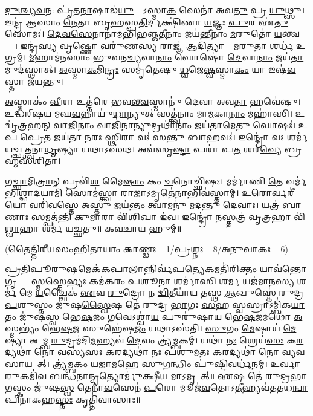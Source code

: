 \ul{𑌦𑍁}\ul{𑌶𑍍𑌚𑍍𑌯}\ul{𑌵}𑌨: 𑌪𑍃॑𑌤\ul{𑌨𑌾}𑌷𑌾𑌡॑\ul{𑌯𑍁}𑌧𑍍𑌯𑍋᳚𑌽𑌸𑍍𑌮𑌾\ul{𑌕}\ul{} 𑌸𑍇𑌨𑌾॑ 𑌅𑌵\ul{𑌤𑍁} 𑌪𑍍𑌰 \ul{𑌯𑍁}𑌥𑍍𑌸𑍁। 𑌇𑌨𑍍𑌦𑍍𑌰॑ 𑌆𑌸𑌾𑌂 \ul{𑌨𑍇}𑌤𑌾 𑌬𑍃\ul{𑌹}𑌸𑍍𑌪\ul{𑌤𑌿}𑌰𑍍𑌦𑌕𑍍𑌷𑌿॑𑌣𑌾 \ul{𑌯}𑌜𑍍𑌞𑌃 \ul{𑌪𑍁}𑌰 𑌏॑\ul{𑌤𑍁} 𑌸𑍋𑌮𑌃॑। \ul{𑌦𑍇}\ul{𑌵}\ul{𑌸𑍇}𑌨𑌾𑌨𑌾॑𑌮𑌭𑌿𑌭𑌞𑍍𑌜\ul{𑌤𑍀}𑌨𑌾𑌂 𑌜𑌯॑𑌨𑍍𑌤𑍀𑌨𑌾𑌂 \ul{𑌮}𑌰𑍁𑌤𑍋॑ \ul{𑌯}𑌨𑍍𑌤𑍍𑌵𑌗𑍍𑌰𑍇᳚। 𑌇𑌨𑍍𑌦𑍍𑌰॑\ul{𑌸𑍍𑌯} 𑌵𑍃\ul{𑌷𑍍𑌣𑍋} 𑌵𑌰𑍁॑𑌣\ul{𑌸𑍍𑌯} 𑌰𑌾𑌜𑍍𑌞॑ 𑌆\ul{𑌦𑌿}𑌤𑍍𑌯𑌾𑌨𑌾𑌂᳚ \ul{𑌮}𑌰𑍁\ul{𑌤𑌾}\ul{} 𑌶𑌰𑍍𑌧॑ \ul{𑌉}𑌗𑍍𑌰𑌮𑍍। \ul{𑌮}𑌹𑌾𑌮॑𑌨𑌸𑌾𑌂 𑌭𑍁𑌵𑌨\ul{𑌚𑍍𑌯}𑌵𑌾\ul{𑌨𑌾𑌂} 𑌘𑍋𑌷𑍋॑ \ul{𑌦𑍇}𑌵𑌾\ul{𑌨𑌾𑌂} 𑌜𑌯॑\ul{𑌤𑌾}𑌮𑍁𑌦॑𑌸𑍍𑌥𑌾𑌤𑍍। \ul{𑌅}𑌸𑍍𑌮𑌾\ul{𑌕}𑌮𑌿\ul{𑌨𑍍𑌦𑍍𑌰𑌃} 𑌸𑌮𑍃॑𑌤𑍇𑌷𑍁 \ul{𑌧𑍍𑌵}𑌜𑍇\ul{𑌷𑍍𑌵}𑌸𑍍𑌮𑌾\ul{𑌕𑌂} 𑌯𑌾 𑌇𑌷॑\ul{𑌵}𑌸𑍍𑌤𑌾 𑌜॑𑌯𑌨𑍍𑌤𑍁।

\ul{𑌅}𑌸𑍍𑌮𑌾𑌕𑌂॑ \ul{𑌵𑍀}𑌰𑌾 𑌉𑌤𑍍𑌤॑𑌰𑍇 𑌭𑌵\ul{𑌨𑍍𑌤𑍍𑌵}𑌸𑍍𑌮𑌾𑌨𑍁॑ 𑌦𑍇𑌵𑌾 𑌅𑌵\ul{𑌤𑌾} 𑌹𑌵𑍇॑𑌷𑍁। 𑌉𑌦𑍍𑌧॑𑌰𑍍‌𑌷𑌯 𑌮𑌘\ul{𑌵}𑌨𑍍𑌨𑌾𑌯𑍁॑\ul{𑌧𑌾}𑌨𑍍𑌯𑍁𑌤𑍍 𑌸𑌤𑍍𑌤𑍍𑌵॑𑌨𑌾𑌂 𑌮𑌾\ul{𑌮}𑌕𑌾\ul{𑌨𑌾𑌂} 𑌮𑌹𑌾॑𑌸𑌿। 𑌉𑌦𑍍𑌵𑍃॑𑌤𑍍𑌰𑌹𑌨𑍍 \ul{𑌵𑌾}𑌜𑌿\ul{𑌨𑌾𑌂} 𑌵𑌾𑌜𑌿॑\ul{𑌨𑌾}𑌨𑍍𑌯𑍁𑌦𑍍𑌰𑌥𑌾॑\ul{𑌨𑌾𑌂} 𑌜𑌯॑𑌤𑌾𑌮𑍇\ul{𑌤𑍁} 𑌘𑍋𑌷𑌃॑। 𑌉\ul{𑌪} 𑌪𑍍𑌰𑍇\ul{𑌤} 𑌜𑌯॑𑌤𑌾 𑌨𑌰𑌃 \ul{𑌸𑍍𑌥𑌿}𑌰𑌾 𑌵𑌃॑ 𑌸𑌨𑍍𑌤𑍁 \ul{𑌬𑌾}𑌹𑌵𑌃॑। 𑌇𑌨𑍍𑌦𑍍𑌰𑍋॑ \ul{𑌵𑌃} 𑌶𑌰𑍍𑌮॑ 𑌯𑌚𑍍𑌛𑌤𑍍𑌤𑍍𑌵𑌨𑌾\ul{𑌧𑍃}𑌷𑍍𑌯𑌾 𑌯𑌥𑌾𑌽𑌸॑𑌥। 𑌅𑌵॑𑌸𑍃\ul{𑌷𑍍𑌟𑌾} 𑌪𑌰𑌾॑ 𑌪\ul{𑌤} 𑌶𑌰॑\ul{𑌵𑍍𑌯𑍇} 𑌬𑍍𑌰𑌹𑍍𑌮॑𑌸𑌶𑌿𑌤𑌾।

𑌗\ul{𑌚𑍍𑌛𑌾}𑌮𑌿\ul{𑌤𑍍𑌰𑌾}𑌨𑍍 𑌪𑍍𑌰𑌵𑌿॑\ul{𑌶} 𑌮𑍈\ul{𑌷𑌾𑌂} 𑌕𑌂 \ul{𑌚}𑌨𑍋𑌚𑍍𑌛𑌿॑𑌷𑌃। 𑌮𑌰𑍍𑌮𑌾॑𑌣𑌿 \ul{𑌤𑍇} 𑌵𑌰𑍍𑌮॑𑌭𑌿𑌶𑍍𑌛𑌾𑌦𑌯𑌾\ul{𑌮𑌿} 𑌸𑍋𑌮॑\ul{𑌸𑍍𑌤𑍍𑌵𑌾} 𑌰𑌾\ul{𑌜𑌾}𑌽𑌮𑍃𑌤𑍇॑\ul{𑌨𑌾}𑌭𑌿𑌵॑𑌸𑍍𑌤𑌾𑌮𑍍। \ul{𑌉}𑌰𑍋𑌰𑍍𑌵𑌰𑍀॑\ul{𑌯𑍋} 𑌵𑌰𑌿॑𑌵𑌸𑍍𑌤𑍇 𑌅\ul{𑌸𑍍𑌤𑍁} 𑌜𑌯॑\ul{𑌨𑍍𑌤𑌂} 𑌤𑍍𑌵𑌾𑌮𑌨𑍁॑ 𑌮𑌦𑌨𑍍𑌤𑍁 \ul{𑌦𑍇}𑌵𑌾𑌃। 𑌯𑌤𑍍𑌰॑ \ul{𑌬𑌾}𑌣𑌾𑌃 \ul{𑌸}𑌮𑍍𑌪𑌤॑𑌨𑍍𑌤𑌿 𑌕𑍁\ul{𑌮𑌾}𑌰𑌾 𑌵𑌿॑\ul{𑌶𑌿}𑌖𑌾 𑌇॑𑌵। 𑌇𑌨𑍍𑌦𑍍𑌰𑍋॑ \ul{𑌨}𑌸𑍍𑌤𑌤𑍍𑌰॑ 𑌵𑍃\ul{𑌤𑍍𑌰}𑌹𑌾 𑌵𑌿॑\ul{𑌶𑍍𑌵𑌾}𑌹𑌾 𑌶𑌰𑍍𑌮॑ 𑌯𑌚𑍍𑌛𑌤𑍁॥
𑌕𑌵𑌚𑌾𑌯 𑌹𑍁𑌮𑍍॥

{\small \closesection}

\centerline{\normalsize (𑌤𑍈𑌤𑍍𑌤𑌿𑌰𑍀𑌯𑌸𑌂𑌹𑌿𑌤𑌾𑌯𑌾𑌂 𑌕𑌾𑌣𑍍𑌡𑌃 – 1/𑌪𑍍𑌰𑌶𑍍𑌨𑌃 – 8/𑌅𑌨𑍁𑌵𑌾𑌕𑌃 – 6)}

\ul{𑌪𑍍𑌰}\ul{𑌤𑌿}\ul{𑌪𑍂}\ul{𑌰𑍁}𑌷𑌮𑍇𑌕॑𑌕𑌪𑌾\ul{𑌲𑌾}𑌨𑍍𑌨𑌿𑌰𑍍𑌵॑\ul{𑌪}𑌤𑍍𑌯𑍇\ul{𑌕}𑌮𑌤𑌿॑𑌰𑌿\ul{𑌕𑍍𑌤𑌂} 𑌯𑌾𑌵॑𑌨𑍍𑌤𑍋 \ul{𑌗𑍃}𑌹𑍍𑌯𑌾𑌃᳚ 𑌸𑍍𑌮𑌸𑍍𑌤𑍇\ul{𑌭𑍍𑌯𑌃} 𑌕𑌮॑𑌕𑌰𑌂 𑌪\ul{𑌶𑍂}𑌨𑌾 𑌶𑌰𑍍𑌮𑌾॑\ul{𑌸𑌿} 𑌶\ul{𑌰𑍍𑌮} 𑌯𑌜॑𑌮𑌾𑌨\ul{𑌸𑍍𑌯} 𑌶𑌰𑍍𑌮॑ 𑌮𑍇 \ul{𑌯}𑌚𑍍𑌛𑍈𑌕॑ \ul{𑌏}𑌵 \ul{𑌰𑍁}𑌦𑍍𑌰𑍋 𑌨 \ul{𑌦𑍍𑌵𑌿}𑌤𑍀𑌯𑌾॑𑌯 𑌤𑌸𑍍𑌥 \ul{𑌆}𑌖𑍁𑌸𑍍𑌤𑍇॑ 𑌰𑍁𑌦𑍍𑌰 \ul{𑌪}𑌶𑍁𑌸𑍍𑌤𑌂 𑌜𑍁॑𑌷\ul{𑌸𑍍𑌵𑍈}𑌷 𑌤𑍇॑ 𑌰𑍁𑌦𑍍𑌰 \ul{𑌭𑌾}𑌗𑌃 \ul{𑌸}𑌹 𑌸𑍍𑌵𑌸𑍍𑌰𑌾𑌽𑌮𑍍𑌬𑌿॑𑌕\ul{𑌯𑌾} 𑌤𑌂 𑌜𑍁॑𑌷𑌸𑍍𑌵 𑌭𑍇\ul{𑌷}𑌜𑌂 𑌗𑌵𑍇𑌽𑌶𑍍𑌵𑌾॑\ul{𑌯} 𑌪𑍁𑌰𑍁॑𑌷𑌾𑌯 𑌭𑍇\ul{𑌷}𑌜𑌮𑌥𑍋॑ \ul{𑌅}𑌸𑍍𑌮𑌭𑍍𑌯𑌂॑ 𑌭𑍇\ul{𑌷}𑌜 𑌸𑍁𑌭𑍇॑𑌷\ul{𑌜𑌂} 𑌯𑌥𑌾𑌽𑌸॑𑌤𑌿। \ul{𑌸𑍁}𑌗𑌂 \ul{𑌮𑍇}𑌷𑌾𑌯॑ \ul{𑌮𑍇}𑌷𑍍𑌯𑌾॑ 𑌅𑌵𑌾᳚𑌮𑍍𑌬 \ul{𑌰𑍁}𑌦𑍍𑌰𑌮॑𑌦𑌿\ul{𑌮}𑌹𑍍𑌯𑌵॑ \ul{𑌦𑍇}𑌵𑌂 𑌤𑍍𑌰𑍍𑌯॑𑌮𑍍𑌬𑌕𑌮𑍍। 𑌯𑌥𑌾॑ \ul{𑌨𑌃} 𑌶𑍍𑌰𑍇𑌯॑\ul{𑌸𑌃} 𑌕\ul{𑌰}𑌦𑍍𑌯𑌥𑌾॑ \ul{𑌨𑍋} 𑌵𑌸𑍍𑌯॑\ul{𑌸𑌃} 𑌕\ul{𑌰}𑌦𑍍𑌯𑌥𑌾॑ 𑌨𑌃 𑌪\ul{𑌶𑍁}𑌮\ul{𑌤𑌃} 𑌕\ul{𑌰}𑌦𑍍𑌯𑌥𑌾॑ 𑌨𑍋 𑌵𑍍𑌯𑌵\ul{𑌸𑌾}𑌯𑌯𑌾᳚𑌤𑍍। 𑌤𑍍𑌰𑍍𑌯॑𑌮𑍍𑌬𑌕𑌂 𑌯𑌜𑌾𑌮𑌹𑍇 𑌸𑍁\ul{𑌗}𑌨𑍍𑌧𑌿𑌂 𑌪𑍁॑\ul{𑌷𑍍𑌟𑌿}𑌵𑌰𑍍𑌧॑𑌨𑌮𑍍। \ul{𑌉}\ul{𑌰𑍍𑌵𑌾}\ul{𑌰𑍁}𑌕𑌮𑌿॑\ul{𑌵} 𑌬𑌨𑍍𑌧॑𑌨𑌾\ul{𑌨𑍍𑌮𑍃}𑌤𑍍𑌯𑍋𑌰𑍍𑌮𑍁॑𑌕𑍍𑌷𑍀\ul{𑌯} 𑌮𑌾𑌽𑌮𑍃𑌤𑌾᳚𑌤𑍍॥ \ul{𑌏}𑌷 𑌤𑍇॑ 𑌰𑍁𑌦𑍍𑌰\ul{𑌭𑌾}𑌗𑌸𑍍𑌤𑌂 𑌜𑍁॑𑌷\ul{𑌸𑍍𑌵} 𑌤𑍇𑌨𑌾॑\ul{𑌵}𑌸𑍇𑌨॑ \ul{𑌪}𑌰𑍋 𑌮𑍂𑌜॑\ul{𑌵}𑌤𑍋𑌽\ul{𑌤𑍀}𑌹𑍍𑌯𑌵॑𑌤𑌤𑌧\ul{𑌨𑍍𑌵𑌾} 𑌪𑌿𑌨𑌾॑𑌕𑌹\ul{𑌸𑍍𑌤𑌃} 𑌕𑍃𑌤𑍍𑌤𑌿॑𑌵𑌾𑌸𑌾𑌃॥


